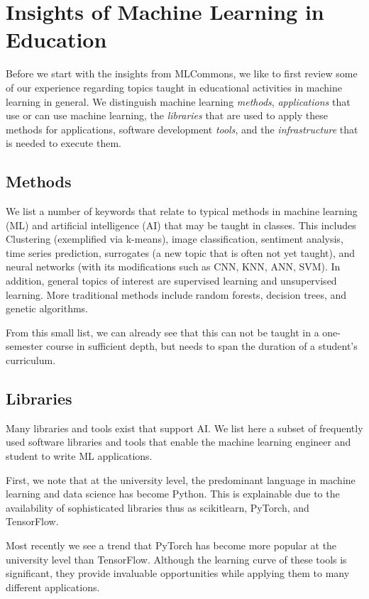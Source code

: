 \documentclass[utf8]{FrontiersinVancouver} %
\begin{document}
\section{Insights of Machine Learning in Education}
\label{sec:edu-ml}

Before we start with the insights from MLCommons, we like to first
review some of our experience regarding topics taught in educational
activities in machine learning in general. We distinguish machine
learning {\em methods}, {\em applications} that use or can use machine
learning, the {\em libraries} that are used to apply these methods for
applications, software development {\em tools}, and the {\em
  infrastructure} that is needed to execute them.

\subsection{Methods}

We list a number of keywords that relate to typical methods in machine
learning (ML) and artificial intelligence (AI) that may be taught in
classes. This includes Clustering (exemplified via k-means), image
classification, sentiment analysis, time series prediction, surrogates
(a new topic that is often not yet taught), and neural networks (with
its modifications such as CNN, KNN, ANN, SVM).  In addition, general
topics of interest are supervised learning and unsupervised learning.
More traditional methods include random forests, decision trees, and
genetic algorithms.

From this small list, we can already see that this can not be taught
in a one-semester course in sufficient depth, but needs to span the
duration of a student's curriculum.

\subsection{Libraries}

Many libraries and tools exist that support AI.  We list here a subset
of frequently used software libraries and tools that enable the
machine learning engineer and student to write ML applications.

First, we note that at the university level, the predominant language
in machine learning and data science has become Python. This is
explainable due to the availability of sophisticated libraries thus as
scikitlearn, PyTorch, and TensorFlow.

Most recently we see a trend that PyTorch has become more popular at
the university level than TensorFlow.  Although the learning curve of
these tools is significant, they provide invaluable opportunities
while applying them to many different applications.
\end{document}
